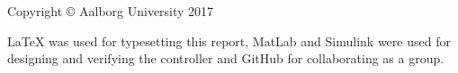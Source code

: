 \thispagestyle{empty}
{\small
\strut\vfill %
\noindent Copyright \copyright{} Aalborg University 2017\par
\vspace{0.2cm}
\noindent \LaTeX \: was used for typesetting this report,
MatLab and Simulink were used for designing and verifying the controller and
GitHub \cite{GitHub} for collaborating as a group.
}
\clearpage